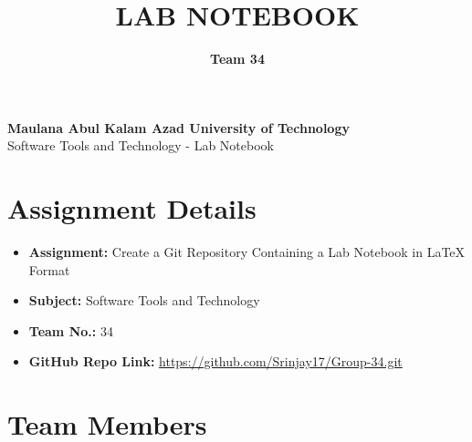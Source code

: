 \documentclass[a4paper,15pt]{article}
\title{\textbf{LAB NOTEBOOK}}
\author{\textbf{Team 34}}
\date{}
\begin{document}
\maketitle


\begin{center}
    \Large\textbf{Maulana Abul Kalam Azad University of Technology}\\
    \vspace{0.2cm}
    \large Software Tools and Technology - Lab Notebook
\end{center}

\vspace{1cm}

\section*{Assignment Details}
\begin{itemize}[leftmargin=1.5cm]
    \item \textbf{Assignment:} Create a Git Repository Containing a Lab Notebook in LaTeX Format
    \item \textbf{Subject:} Software Tools and Technology
    \item \textbf{Team No.:} 34
    \item \textbf{GitHub Repo Link:} \url{https://github.com/Srinjay17/Group-34.git}
\end{itemize}

\vspace{1cm}

\section*{Team Members}

    
\end{document}
